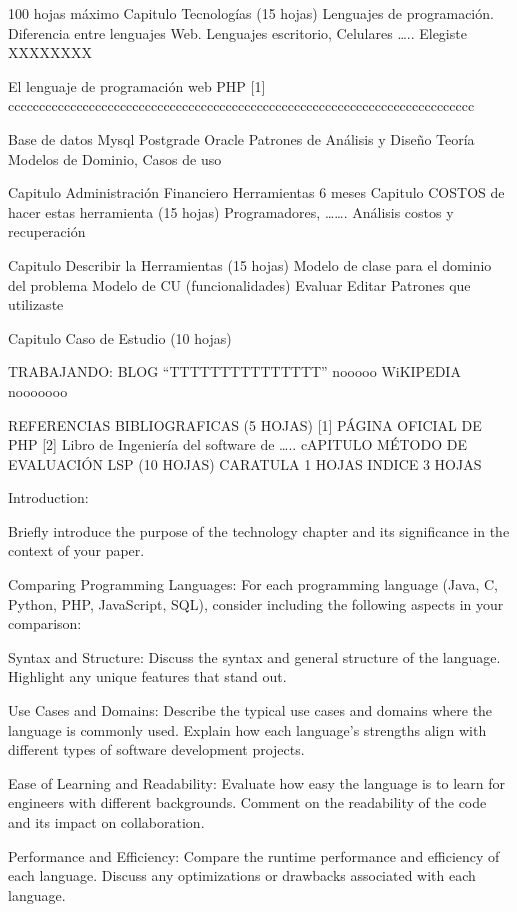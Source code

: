 100 hojas máximo
Capitulo Tecnologías (15 hojas)
Lenguajes de programación.
Diferencia entre lenguajes Web. Lenguajes escritorio, Celulares …..
Elegiste XXXXXXXX

El lenguaje de programación web PHP [1] ccccccccccccccccccccccccccccccccccccccccccccccccccccccccccccccccccccccccccc

Base de datos
	Mysql
	Postgrade
	Oracle
Patrones de Análisis y Diseño Teoría
Modelos de Dominio, Casos de uso

Capitulo  Administración Financiero
Herramientas 6 meses
Capitulo COSTOS de hacer estas herramienta  (15 hojas)
Programadores, …….
Análisis costos y recuperación


Capitulo Describir la Herramientas (15 hojas)
Modelo de clase para el dominio del problema
Modelo de CU (funcionalidades)
	Evaluar
Editar
Patrones que utilizaste

Capitulo Caso de Estudio (10 hojas)

TRABAJANDO:
BLOG “TTTTTTTTTTTTTTT”   nooooo
WiKIPEDIA   nooooooo

REFERENCIAS BIBLIOGRAFICAS (5 HOJAS)
[1] PÁGINA OFICIAL DE PHP    
[2] Libro de Ingeniería del software de …..
cAPITULO MÉTODO DE EVALUACIÓN
LSP
(10 HOJAS)
CARATULA 1 HOJAS
INDICE 3 HOJAS

Introduction:

    Briefly introduce the purpose of the technology chapter and its significance in the context of your paper.

Comparing Programming Languages:
For each programming language (Java, C, Python, PHP, JavaScript, SQL), consider including the following aspects in your comparison:

    Syntax and Structure:
        Discuss the syntax and general structure of the language.
        Highlight any unique features that stand out.

    Use Cases and Domains:
        Describe the typical use cases and domains where the language is commonly used.
        Explain how each language's strengths align with different types of software development projects.

    Ease of Learning and Readability:
        Evaluate how easy the language is to learn for engineers with different backgrounds.
        Comment on the readability of the code and its impact on collaboration.

    Performance and Efficiency:
        Compare the runtime performance and efficiency of each language.
        Discuss any optimizations or drawbacks associated with each language.

